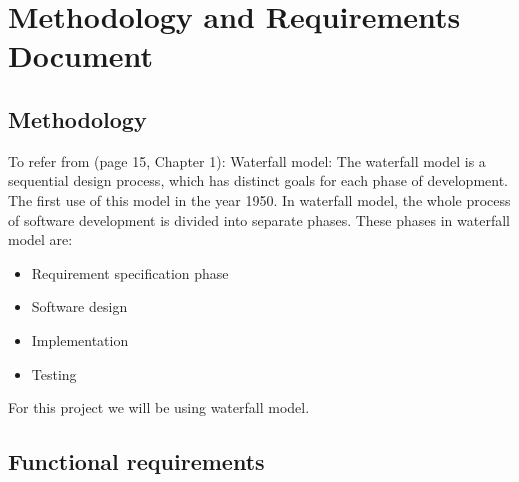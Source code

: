 \documentclass{report}
\begin{document}
\chapter{Methodology and Requirements Document}
\label{cha:methrecdoc}

\section{Methodology}
\label{sec:meth}

To refer from \cite{Hamlet2001TheEngineeringofSoftware}(page 15, Chapter 1): Waterfall model: The waterfall model is a sequential design process, which has distinct goals for each phase of development. The first use of this model in the year 1950. In waterfall model, the whole process of software development is divided into separate phases. These phases in waterfall model are:
\begin{itemize}
\item Requirement specification phase
\item Software design
\item Implementation 
\item Testing 

\end{itemize}

For this project we will be using waterfall model. 


\section{Functional requirements}
\label{sec:functreq}
\end{document}
